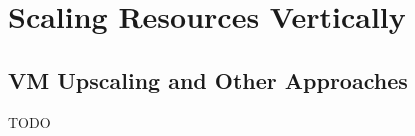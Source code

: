 
\chapter{Scaling Resources Vertically}\label{chapter:introduction}

\section{VM Upscaling and Other Approaches}
TODO